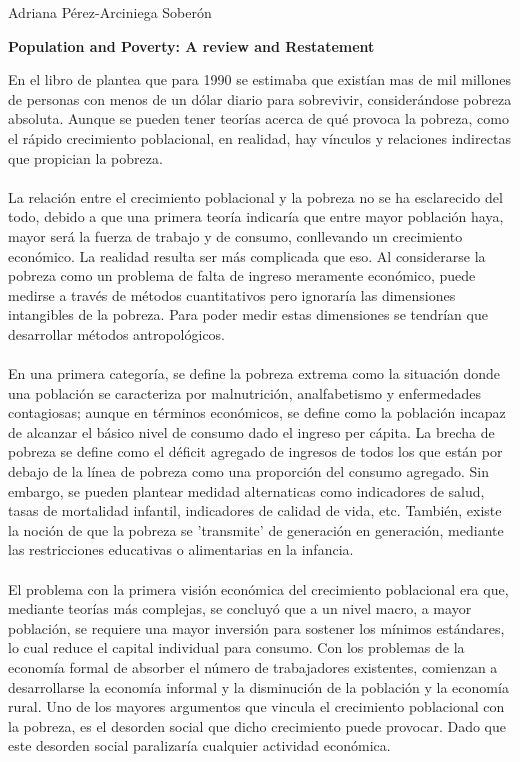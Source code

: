 \documentclass[11pt,spanish,letterpaper]{article}
\theoremstyle{plain}
\begin{document}
\begin{flushleft}
Adriana P\'erez-Arciniega Sober\'on
\end{flushleft}
\begin{center}
\textbf{Population and Poverty: A review and Restatement}
\end{center}
En el libro de \cite{mcnicoll1997population} plantea que para 1990 se estimaba que exist\'ian mas de mil millones de personas con menos de un d\'olar diario para sobrevivir, consider\'andose pobreza absoluta. Aunque se pueden tener teor\'ias acerca de qu\'e provoca la pobreza, como el r\'apido crecimiento poblacional, en realidad, hay v\'inculos y relaciones indirectas que propician la pobreza.\\
\\
La relaci\'on entre el crecimiento poblacional y la pobreza no se ha esclarecido del todo, debido a que una primera teor\'ia indicar\'ia que entre mayor poblaci\'on haya, mayor ser\'a la fuerza de trabajo y de consumo, conllevando un crecimiento econ\'omico. La realidad resulta ser m\'as complicada que eso. Al considerarse la pobreza como un problema de falta de ingreso meramente econ\'omico, puede medirse a trav\'es de m\'etodos cuantitativos pero ignorar\'ia las dimensiones intangibles de la pobreza. Para poder medir estas dimensiones se tendr\'ian que desarrollar m\'etodos antropol\'ogicos.\\
\\
En una primera categor\'ia, se define la pobreza extrema como la situaci\'on donde una poblaci\'on se caracteriza por malnutrici\'on, analfabetismo y enfermedades contagiosas; aunque en t\'erminos econ\'omicos, se define como la poblaci\'on incapaz de alcanzar el b\'asico nivel de consumo dado el ingreso per c\'apita. La brecha de pobreza se define como el d\'eficit agregado de ingresos de todos los que est\'an por debajo de la l\'inea de pobreza como una proporci\'on del consumo agregado. Sin embargo, se pueden plantear medidad alternaticas como indicadores de salud, tasas de mortalidad infantil, indicadores de calidad de vida, etc. Tambi\'en, existe la noci\'on de que la pobreza se 'transmite' de generaci\'on en  generaci\'on, mediante las restricciones educativas o alimentarias en la infancia.\\
\\
El problema con la primera visi\'on econ\'omica del crecimiento poblacional era que, mediante teor\'ias m\'as complejas, se concluy\'o que a un nivel macro, a mayor poblaci\'on, se requiere una mayor inversi\'on para sostener los m\'inimos est\'andares, lo cual reduce el capital individual para consumo. Con los problemas de la econom\'ia formal de absorber el n\'umero de trabajadores existentes, comienzan a desarrollarse la econom\'ia informal y la disminuci\'on de la poblaci\'on y la econom\'ia rural. Uno de los mayores argumentos que vincula el crecimiento poblacional con la pobreza, es el desorden social que dicho crecimiento puede provocar. Dado que este desorden social paralizar\'ia cualquier actividad econ\'omica.\\
\end{document}
